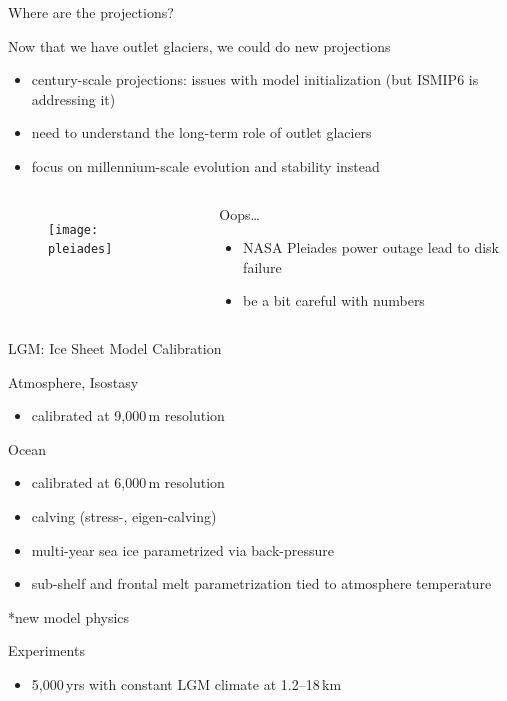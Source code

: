 \documentclass[hide notes,intlimits]{beamer}
\begin{document}
\begin{frame}{Where are the projections?}
  \begin{block}{Now that we have outlet glaciers, we could do new projections}
    \begin{itemize}
    \item century-scale projections: issues with model initialization (but ISMIP6 is addressing it)
    \item need to understand the long-term role of outlet glaciers
    \item \alert{focus on millennium-scale evolution and stability instead}
    \end{itemize}
  \end{block}
  \begin{columns}
    \column[T]{5cm}
    \begin{figure}
      \texttt{[image: pleiades]}
    \end{figure}
    \column[T]{5cm}
    \begin{block}{Oops\ldots}
      \begin{itemize}
      \item NASA Pleiades power outage lead to disk failure
      \item be a bit careful with numbers
      \end{itemize}
    \end{block}
  \end{columns}
\end{frame}

{
%
} 


\begin{frame}{LGM: Ice Sheet Model Calibration}
  \begin{block}{Atmosphere, Isostasy}
    \begin{itemize}
    \item calibrated at 9,000\,m resolution
    \end{itemize}
  \end{block}
  \begin{block}{Ocean}
    \begin{itemize}
    \item calibrated at 6,000\,m resolution
    \item calving (\alert{stress}-, eigen-calving)
    \item \alert{multi-year sea ice parametrized via back-pressure}
    \item \alert{sub-shelf and frontal melt} parametrization tied to atmosphere temperature
    \end{itemize}
  \end{block}
    \alert{*new model physics}
  \begin{block}{Experiments}
    \begin{itemize}
    \item 5,000\,yrs with constant LGM climate at 1.2--18\,km
    \end{itemize}
  \end{block}
\end{frame}
\end{document}
